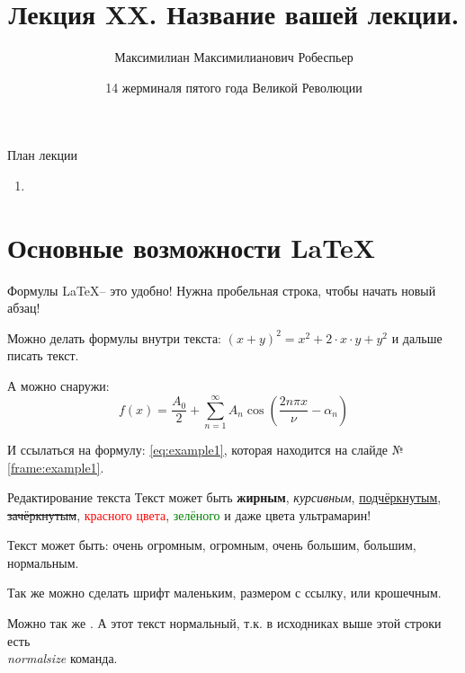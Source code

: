 \documentclass{beamer}
\title{Лекция XX. Название вашей лекции.}
\date{14 жерминаля пятого года Великой Революции}
\author{Максимилиан Максимилианович Робеспьер}
\institute{Москва, МГТУ им.Бауманка,\\ \href{https://t.me/iu8info}{\textbf{КИБ}}}
\newcommand{\рис}[1]{рис.\ref{#1}}
\newcommand{\Рис}[1]{Рис.\ref{#1}}
\newcommand{\таблицa}[1]{таблица~№\ref{#1}} %
\newcommand{\таблицы}[1]{таблицы~№\ref{#1}} %
\newcommand{\таблице}[1]{таблице~№\ref{#1}} %
\newcommand{\таблицу}[1]{таблицу~№\ref{#1}} %
\newcommand{\таблицей}[1]{таблицей~№\ref{#1}} %
\newcommand{\Таблицa}[1]{Таблица~№\ref{#1}} %
\newcommand{\Таблицы}[1]{Таблицы~№\ref{#1}} %
\newcommand{\Таблице}[1]{Таблице~№\ref{#1}} %
\newcommand{\Таблицу}[1]{Таблицу~№\ref{#1}} %
\newcommand{\Таблицей}[1]{Таблицей~№\ref{#1}} %
\begin{document}
  \maketitle
    
  \begin{frame}{План лекции}
    \begin{enumerate}
	\item {}
	\end{enumerate}
 \end{frame}
    
    
\section{Основные возможности \LaTeX}\label{section:main_latex_opportunity}

\begin{frame}{Формулы}\label{frame:example1}
   \LaTeX -- это удобно!
   Нужна
   пробельная
   строка,
   чтобы
   начать новый абзац!
   
   Можно делать формулы внутри текста: $(x+y)^2=x^2 + 2 \cdot x \cdot y + y^2$ и дальше писать
   текст.
   
   А можно снаружи:
   \begin{equation}\label{eq:example1}
   	f(x) = \frac{A_0}{2} + \sum \limits_{n=1}^{\infty} A_n \cos \left( \frac{2 n \pi x}{\nu} - \alpha_n \right) 
   \end{equation}
   
   И ссылаться на формулу: \eqref{eq:example1}, 
   которая находится на слайде №\ref{frame:example1}.  
\end{frame}

\begin{frame}{Редактирование текста}
	Текст может быть 
	\textbf{жирным}, 
	\textit{курсивным},
	\underline{подчёркнутым},
	\sout{зачёркнутым},
	\textcolor{red}{красного цвета}, \textcolor{green}{зелёного} 	
	и даже \textcolor[RGB]{18,10,143}{цвета ультрамарин}! 
	
	Текст может быть:
	\Huge очень огромным,
	\huge огромным,
	\Large очень большим,
	\large большим,
	\normalsize нормальным.
	
	Так же можно сделать шрифт
	\small маленьким,
	\footnotesize размером с ссылку,
	\tiny или крошечным.
	
	Можно так же .
	\normalsize
	А этот текст нормальный, т.к. в исходниках выше этой строки есть \textit{\\normalsize} команда.
\end{frame}
\end{document}
